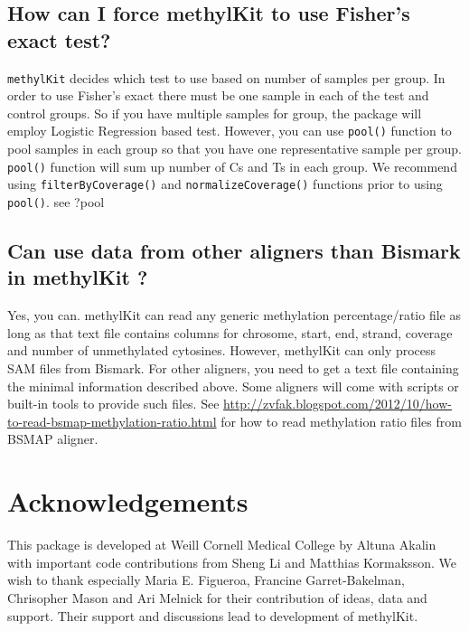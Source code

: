 \documentclass{article}
\begin{document}
\subsection{How can I force methylKit to use Fisher's exact test?}
\texttt{methylKit} decides which test to use based on number of samples per group.
In order to use Fisher's exact there must be one sample in each of the test and
control groups. So if you have multiple samples for group, the package will
employ Logistic Regression based test. However, you can use \texttt{pool()} 
function to pool samples in each group so that you have one representative sample
per group. \texttt{pool()} function will sum up number of Cs and Ts in each group.
We recommend using \texttt{filterByCoverage()} and \texttt{normalizeCoverage()} 
functions prior to using \texttt{pool()}.
see ?pool

\subsection{Can use data from other aligners than Bismark in methylKit ?}
Yes, you can. methylKit can read any generic methylation percentage/ratio file
as long as that text file contains columns for chrosome, start, end, strand, 
coverage and number of unmethylated cytosines. However, methylKit can only 
process SAM files from Bismark. For other aligners, you need to get a text file
containing the minimal information described above. Some aligners will come with
scripts or built-in tools to provide such files.
See \url{http://zvfak.blogspot.com/2012/10/how-to-read-bsmap-methylation-ratio.html} 
for how to read methylation ratio files from BSMAP\cite{Xi2009} aligner.


\section{Acknowledgements}
This package is developed at Weill Cornell Medical College by Altuna Akalin 
with important code contributions from Sheng Li and Matthias Kormaksson. 
We wish to thank especially Maria E. Figueroa, Francine Garret-Bakelman, 
Chrisopher Mason and Ari Melnick for their contribution of ideas, data and 
support. Their support and discussions lead to development of methylKit.
\end{document}
